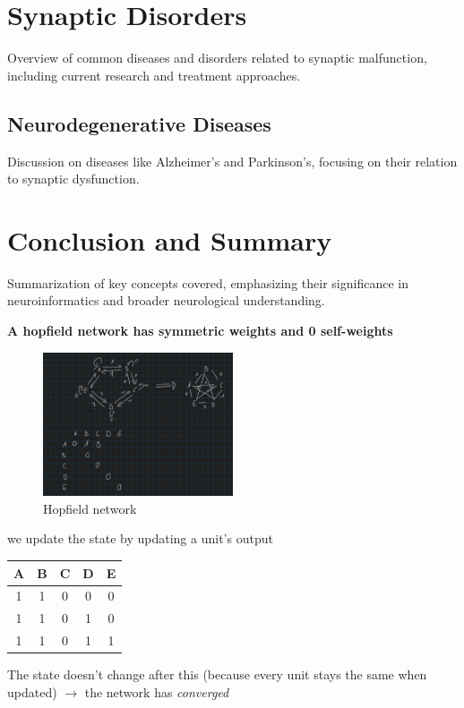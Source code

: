 \documentclass{article}
\begin{document}
\section{Synaptic Disorders}
Overview of common diseases and disorders related to synaptic malfunction, including current research and treatment approaches.

\subsection{Neurodegenerative Diseases}
Discussion on diseases like Alzheimer's and Parkinson's, focusing on their relation to synaptic dysfunction.

\section{Conclusion and Summary}
Summarization of key concepts covered, emphasizing their significance in neuroinformatics and broader neurological understanding.

\noindent\textbf{A hopfield network has symmetric weights and 0 self-weights}

\begin{figure}[H]
\centering
\includegraphics[width=0.5\textwidth]{assets/hopfieldNetwork.png}
\caption{Hopfield network}
\end{figure}

\noindent we update the state by updating a unit's output

\begin{center}
\begin{tabular}{ |c|c|c|c|c| }
\hline
A & B & C & D & E \\
\hline
1 & 1 & 0 & 0 & 0 \\
1 & 1 & 0 & 1 & 0 \\
1 & 1 & 0 & 1 & 1 \\
\hline
\end{tabular}
\end{center}

\noindent The state doesn't change after this (because every unit stays the same when updated) $\rightarrow$ the network has \textit{converged}
\end{document}
